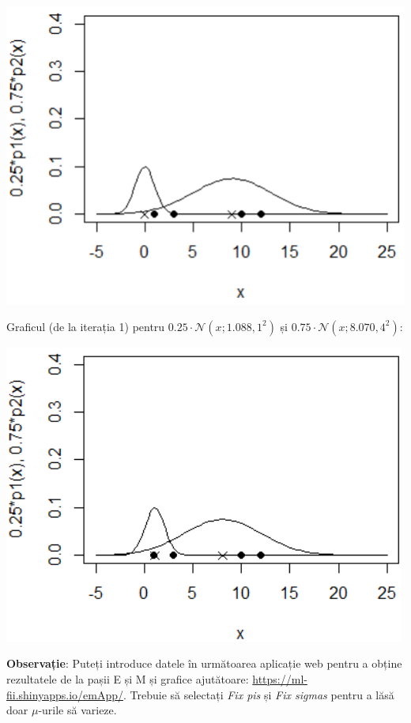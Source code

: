 \documentclass[12pt]{article}
\begin{document}
\begin{enumerate}
\begin{enumerate}
		\begin{center}
			\includegraphics{screenshot012}
		\end{center}
		
			
			\newpage
			Graficul (de la iterația 1) pentru $0.25 \cdot \mathcal{N}(x;1.088,1^2)$ și $0.75 \cdot \mathcal{N}(x;8.070,4^2)$:
			\begin{center}
				\includegraphics[width=0.8\linewidth]{screenshot013}
			\end{center}
			
			
			
			\textbf{Observație}: Puteți introduce datele în următoarea aplicație web pentru a obține rezultatele de la pașii E și M și grafice ajutătoare: \url{https://ml-fii.shinyapps.io/emApp/}. Trebuie să selectați \textit{Fix pis} și \textit{Fix sigmas} pentru a lăsă doar $\mu$-urile să varieze.
			

\end{enumerate}
\end{enumerate}
\end{document}

